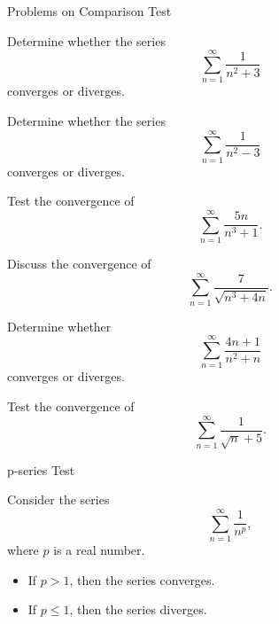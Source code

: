 \documentclass[12pt, a4paper]{article}
\begin{document}
\clearpage

\begin{heading}
    Problems on Comparison Test
\end{heading}

\begin{problem}
Determine whether the series 
\[
\sum_{n=1}^{\infty} \frac{1}{n^2 + 3}
\]
converges or diverges.
\end{problem}

\clearpage

\begin{problem}
Determine whether the series 
\[
\sum_{n=1}^{\infty} \frac{1}{n^2 - 3}
\]
converges or diverges.
\end{problem}

\clearpage

\begin{problem}
Test the convergence of 
\[
\sum_{n=1}^{\infty} \frac{5n}{n^3 + 1}.
\]
\end{problem}

\clearpage

\begin{problem}
Discuss the convergence of 
\[
\sum_{n=1}^{\infty} \frac{7}{\sqrt{n^3 + 4n}}.
\]
\end{problem}

\clearpage

\begin{problem}
Determine whether
\[
\sum_{n=1}^{\infty} \frac{4n+1}{n^2+n}
\]
converges or diverges.
\end{problem}

\clearpage

\begin{problem}
Test the convergence of
\[
\sum_{n=1}^{\infty} \frac{1}{\sqrt{n} + 5}.
\]
\end{problem}

\clearpage

\begin{heading}
	p-series Test
\end{heading}

\vspace{10pt}

\begin{theorem}
	Consider the series
	\[
	\sum_{n=1}^{\infty} \frac{1}{n^{p}},
	\]
	where \(p\) is a real number.

	\begin{itemize}
		\item[(i)] If \(p > 1\), then the series converges.
		\item[(ii)] If \(p \le 1\), then the series diverges.
	\end{itemize}
\end{theorem}
\end{document}
